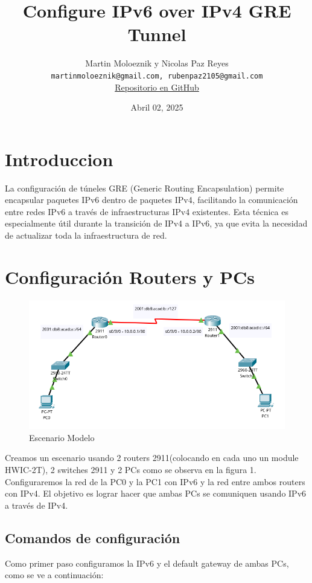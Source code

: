 \documentclass[a4paper,12pt]{article}
\title{\textbf{Configure IPv6 over IPv4 GRE Tunnel}}
\author{
    \begin{tabular}{c}
        Martin Moloeznik y Nicolas Paz Reyes \\
        \texttt{martinmoloeznik@gmail.com, rubenpaz2105@gmail.com} \\
        \href{https://github.com/N1C0-P4Z/IPv6-over-IPv4-GRE-Tunnels}{Repositorio en GitHub}
    \end{tabular}
}
\date{Abril 02, 2025}
\begin{document}
\maketitle

\section{Introduccion}
La configuración de túneles GRE (Generic Routing Encapsulation) permite encapsular paquetes IPv6 dentro de paquetes IPv4, facilitando la comunicación entre redes IPv6 a través de infraestructuras IPv4 existentes. Esta técnica es especialmente útil durante la transición de IPv4 a IPv6, ya que evita la necesidad de actualizar toda la infraestructura de red.
\section{Configuración Routers y PCs}
\begin{figure}[h]
    \centering
    \includegraphics[width=1\textwidth]{imagenes/lab1.png}
    \caption{Escenario Modelo}
  \end{figure}
\FloatBarrier

Creamos un escenario usando 2 routers 2911(colocando en cada uno un module HWIC-2T), 2 switches 2911 y 2 PCs como se observa en la figura 1. Configuraremos la red de la PC0 y la PC1 con IPv6 y la red entre ambos routers con IPv4. El objetivo es lograr hacer que ambas PCs se comuniquen usando IPv6 a través de IPv4.\\
\subsection{Comandos de configuración}

Como primer paso configuramos la IPv6 y el default gateway de ambas PCs, como se ve a continuación:\\
\end{document}
